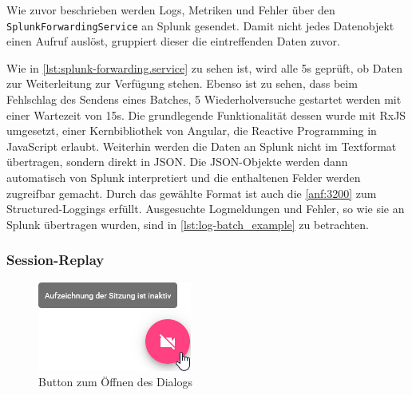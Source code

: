 Wie zuvor beschrieben werden Logs, Metriken und Fehler über den  \texttt{SplunkForwardingService} an Splunk gesendet. Damit nicht jedes Datenobjekt einen Aufruf auslöst, gruppiert dieser die eintreffenden Daten zuvor.

Wie in \autoref{lst:splunk-forwarding.service} zu sehen ist, wird alle 5s geprüft, ob Daten zur Weiterleitung zur Verfügung stehen. Ebenso ist zu sehen, dass beim Fehlschlag des Sendens eines Batches, 5 Wiederholversuche gestartet werden mit einer Wartezeit von 15s. Die grundlegende Funktionalität dessen wurde mit RxJS \cite{RxJS} umgesetzt, einer Kernbibliothek von Angular, die Reactive Programming \cite{ReactiveProgramming} in JavaScript erlaubt. Weiterhin werden die Daten an Splunk nicht im Textformat übertragen, sondern direkt in JSON. Die JSON-Objekte werden dann automatisch von Splunk interpretiert und die enthaltenen Felder werden zugreifbar gemacht. Durch das gewählte Format \cite{StructuredAndInteroperableLogging} ist auch die \autoref{anf:3200} zum Structured-Loggings erfüllt. Ausgesuchte Logmeldungen und Fehler, so wie sie an Splunk übertragen wurden, sind in \autoref{lst:log-batch_example} zu betrachten.



\pagebreak



\subsubsection{Session-Replay}

\begin{figure}
\centering
\includegraphics[width=\linewidth]{img/04_erstellung-poc/implementierung_frontend_recording-consent_button-inactive.png}
\caption{Button zum Öffnen des Dialogs}
\label{fig:recording-consent_button-inactive}
\end{figure}

